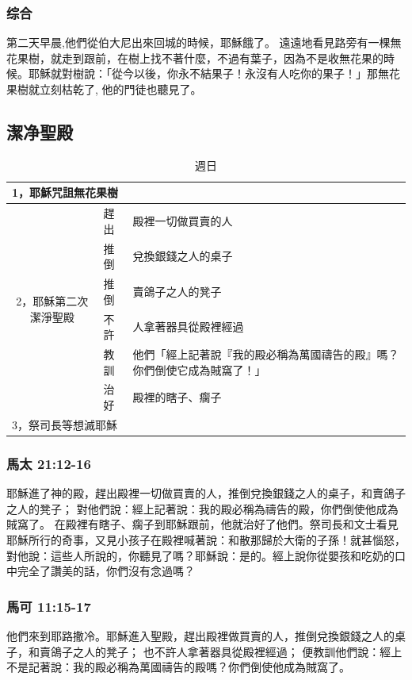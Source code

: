 \subsubsection{综合}
第二天早晨,他們從伯大尼出來回城的時候，耶穌餓了。 遠遠地看見路旁有一棵無花果樹，就走到跟前，在樹上找不著什麼，不過有葉子，因為不是收無花果的時候。耶穌就對樹說：「從今以後，你永不結果子！永沒有人吃你的果子！」那無花果樹就立刻枯乾了, 他的門徒也聽見了。

\subsection{潔净聖殿}
\begin{table}[htbp]
  \centering
    \begin{tabular}{|l|l|l|}
    \toprule
    \multicolumn{3}{|l|}{1，耶穌咒詛無花果樹} \\
    \midrule
    \multicolumn{1}{|c|}{\multirow{6}{*}{\parbox{0.08\textwidth}{2，耶穌第二次潔淨聖殿}}} & 趕出    & 殿裡一切做買賣的人 \\
\cmidrule{2-3}          & 推倒    & 兌換銀錢之人的桌子 \\
\cmidrule{2-3}          & 推倒    & 賣鴿子之人的凳子 \\
\cmidrule{2-3}          & 不許    & 人拿著器具從殿裡經過 \\
\cmidrule{2-3}          & 教訓    & \multicolumn{1}{p{35.145em}|}{他們「經上記著說『我的殿必稱為萬國禱告的殿』嗎？你們倒使它成為賊窩了！」} \\
\cmidrule{2-3}          & 治好    & 殿裡的瞎子、瘸子 \\
    \midrule
    \multicolumn{3}{|l|}{3，祭司長等想滅耶穌} \\
    \bottomrule
    \end{tabular}%
      \caption{週日}
  \label{tab:addlabel}%
\end{table}

\subsubsection{馬太 21:12-16}
耶穌進了神的殿，趕出殿裡一切做買賣的人，推倒兌換銀錢之人的桌子，和賣鴿子之人的凳子；
對他們說：經上記著說：我的殿必稱為禱告的殿，你們倒使他成為賊窩了。
在殿裡有瞎子、瘸子到耶穌跟前，他就治好了他們。祭司長和文士看見耶穌所行的奇事，又見小孩子在殿裡喊著說：和散那歸於大衛的子孫！就甚惱怒，
對他說：這些人所說的，你聽見了嗎？耶穌說：是的。經上說你從嬰孩和吃奶的口中完全了讚美的話，你們沒有念過嗎？
\subsubsection{馬可 11:15-17}
他們來到耶路撒冷。耶穌進入聖殿，趕出殿裡做買賣的人，推倒兌換銀錢之人的桌子，和賣鴿子之人的凳子；
也不許人拿著器具從殿裡經過；
便教訓他們說：經上不是記著說：我的殿必稱為萬國禱告的殿嗎？你們倒使他成為賊窩了。

